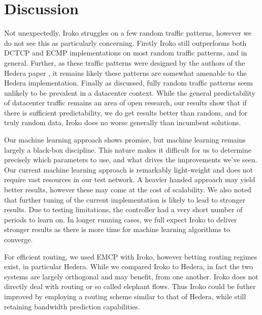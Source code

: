 \section{Discussion}
\label{sec:discussion}

Not unexpectedly, Iroko struggles on a few random traffic patterns, however we
do not see this as particularly concerning. Firstly Iroko still outperforms
both DCTCP and ECMP implementations on most random traffic patterns, and in general.
Further, as these traffic patterns
were designed by the authors of the Hedera paper \cite{hedera}, it remains
likely these patterns are somewhat amenable to the Hedera implementation.
Finally as discussed, fully random traffic patterns seem unlikely to be prevalent in a
datacenter context. While the general predictability of datacenter
traffic remains an area of open research, our results show that
if there is sufficient predictability, we do get results better than
random, and for truly random data, Iroko does no worse generally than
incumbent solutions. 

Our machine learning approach shows promise, but machine learning remains
largely a black-box discipline. This nature makes it difficult for us
to determine precisely which parameters to use, and what drives
the improvements we've seen. Our current machine learning approach
is remarkably light-weight and does not require vast resources
in our test network. A heavier handed approach may yield better
results, however these may come at the cost of scalability. We
also noted that further tuning of the current implementation is
likely to lead to stronger results. Due to testing limitations, 
the controller had a very short number of periods to learn 
on. In longer running cases, we full expect Iroko to 
deliver stronger results as there is more time for machine learning 
algorithms to converge. 

For efficient routing, we used EMCP with Iroko, however betting
routing regimes exist, in particular Hedera. While we compared
Iroko to Hedera, in fact the two systems are largely orthogonal
and may benefit, from one another. Iroko does not directly deal
with routing or so called elephant flows. Thus Iroko could be
futher improved by employing a routing scheme similar to that of
Hedera, while still retaining bandwidth prediction capabilities.


